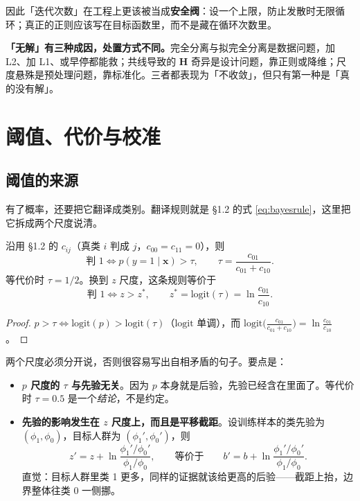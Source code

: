 \documentclass[11pt,a4paper,fontset=windows,zihao=-4]{ctexart}
\newcommand{\bx}{\mathbf{x}}
\newcommand{\bH}{\mathbf{H}}
\begin{document}
因此「迭代次数」在工程上更该被当成\textbf{安全阀}：设一个上限，防止发散时无限循环；真正的正则应该写在目标函数里，而不是藏在循环次数里。

\begin{keybox}[本节结论]
\textbf{「无解」有三种成因，处置方式不同。}完全分离与拟完全分离是数据问题，加 L2、加 L1、或早停都能救；共线导致的 $\bH$ 奇异是设计问题，靠正则或降维；尺度悬殊是预处理问题，靠标准化。三者都表现为「不收敛」，但只有第一种是「真的没有解」。
\end{keybox}


\section{阈值、代价与校准}

\subsection{阈值的来源}

有了概率，还要把它翻译成类别。翻译规则就是 \S1.2 的式 \eqref{eq:bayesrule}，这里把它拆成两个尺度说清。

\begin{prop}[贝叶斯最优阈值]
沿用 \S1.2 的 $c_{ij}$（真类 $i$ 判成 $j$，$c_{00}=c_{11}=0$），则
\begin{equation}
  \text{判 }1\iff p(y=1\mid\bx)>\tau,\qquad \tau=\frac{c_{01}}{c_{01}+c_{10}} .
\end{equation}
等代价时 $\tau=1/2$。换到 $z$ 尺度，这条规则等价于
\begin{equation}
  \text{判 }1\iff z>z^{\ast},\qquad z^{\ast}=\mathrm{logit}(\tau)=\ln\frac{c_{01}}{c_{10}} .
  \label{eq:zstar}
\end{equation}
\end{prop}

\begin{proof}
$p>\tau\iff\mathrm{logit}(p)>\mathrm{logit}(\tau)$（$\mathrm{logit}$ 单调），而 $\mathrm{logit}\bigl(\frac{c_{01}}{c_{01}+c_{10}}\bigr)=\ln\frac{c_{01}}{c_{10}}$。
\end{proof}

两个尺度必须分开说，否则很容易写出自相矛盾的句子。要点是：

\begin{itemize}
  \item \textbf{$p$ 尺度的 $\tau$ 与先验无关}。因为 $p$ 本身就是后验，先验已经含在里面了。等代价时 $\tau=0.5$ 是一个\emph{结论}，不是约定。
  \item \textbf{先验的影响发生在 $z$ 尺度上，而且是平移截距}。设训练样本的类先验为 $(\phi_1,\phi_0)$，目标人群为 $(\phi_1',\phi_0')$，则
  \begin{equation}
    z'=z+\ln\frac{\phi_1'/\phi_0'}{\phi_1/\phi_0},
    \qquad\text{等价于}\qquad
    b'=b+\ln\frac{\phi_1'/\phi_0'}{\phi_1/\phi_0}.
    \label{eq:priorshift}
  \end{equation}
  直觉：目标人群里类 1 更多，同样的证据就该给更高的后验——截距上抬，边界整体往类 0 一侧挪。
\end{itemize}
\end{document}
